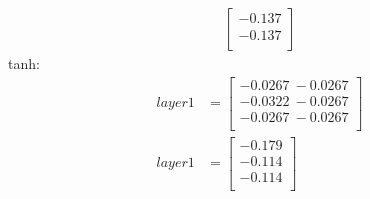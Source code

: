 \documentclass[11pt]{article}
\begin{document}
\begin{enumerate} [(a)]
\begin{align}
\begin{bmatrix}
           -0.137 \\
           -0.137 \\
         \end{bmatrix}
  \end{align}
  tanh:   \begin{align}
    layer 1 &= \begin{bmatrix}
           -0.0267\ -0.0267 \\
           -0.0322\ -0.0267 \\
           -0.0267\ -0.0267 \\
         \end{bmatrix}\\
    layer 1 &= \begin{bmatrix}
           -0.179 \\
           -0.114 \\
           -0.114 \\
         \end{bmatrix}
  \end{align}
\end{enumerate}
\end{document}
